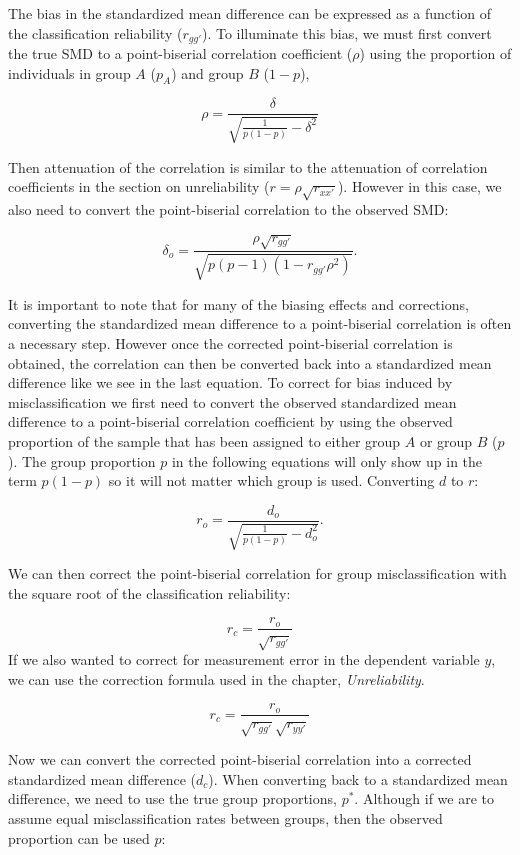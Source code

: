 \documentclass[
  letterpaper,
  DIV=11,
  numbers=noendperiod]{scrreprt}
\begin{document}
The bias in the standardized mean difference can be expressed as a
function of the classification reliability (\(r_{gg'}\)). To illuminate
this bias, we must first convert the true SMD to a point-biserial
correlation coefficient (\(\rho\)) using the proportion of individuals
in group \(A\) (\(p_A\)) and group \(B\) (\(1-p\)),

\[
\rho = \frac{\delta}{\sqrt{\frac{1}{p(1-p)}-\delta^2}}
\]

Then attenuation of the correlation is similar to the attenuation of
correlation coefficients in the section on unreliability
(\(r = \rho\sqrt{r_{xx'}}\)). However in this case, we also need to
convert the point-biserial correlation to the observed SMD:

\[
\delta_o =\frac{ \rho \sqrt{r_{gg'}} }{\sqrt{p (p-1)\left(1- r_{gg'} \rho^2\right) }}.
\]

It is important to note that for many of the biasing effects and
corrections, converting the standardized mean difference to a
point-biserial correlation is often a necessary step. However once the
corrected point-biserial correlation is obtained, the correlation can
then be converted back into a standardized mean difference like we see
in the last equation. To correct for bias induced by misclassification
we first need to convert the observed standardized mean difference to a
point-biserial correlation coefficient by using the observed proportion
of the sample that has been assigned to either group \(A\) or group
\(B\) (\(p\)). The group proportion \(p\) in the following equations
will only show up in the term \(p(1-p)\) so it will not matter which
group is used. Converting \(d\) to \(r\):

\[
r_o = \frac{d_o}{\sqrt{\frac{1}{p(1-p)}-d_o^2}}.
\]

We can then correct the point-biserial correlation for group
misclassification with the square root of the classification
reliability:

\[
r_c = \frac{r_o}{\sqrt{r_{gg'}}}
\] If we also wanted to correct for measurement error in the dependent
variable \(y\), we can use the correction formula used in the chapter,
\emph{Unreliability}.

\[
r_c = \frac{r_o}{\sqrt{r_{gg'}}\sqrt{r_{yy'}}}
\]

Now we can convert the corrected point-biserial correlation into a
corrected standardized mean difference (\(d_c\)). When converting back
to a standardized mean difference, we need to use the true group
proportions, \(p^*\). Although if we are to assume equal
misclassification rates between groups, then the observed proportion can
be used \(p\):
\end{document}
